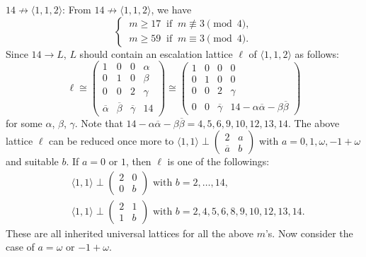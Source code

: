 \documentclass[a4paper,10pt,reqno]{amsart}
\begin{document}
{} $14 \not\to {\langle {1,1,2} \rangle}$: From $14 \not\to {\langle {1,1,2} \rangle}$, we have
\[
    \begin{cases}
        ~m \ge 17 ~\text{ if } ~m {\not\equiv} 3 \pmod{4},\\
        ~m \ge 59 ~\text{ if } ~m \equiv  3 \pmod{4}.
    \end{cases}
\]
Since $14 \to L$, $L$ should contain an escalation lattice $\ell$ of ${\langle {1,1,2} \rangle}$ as follows:
\[  \ell \cong
    \begin{pmatrix}
        1 & 0 & 0 & \alpha \\
        0 & 1 & 0 & \beta \\
        0 & 0 & 2 & \gamma \\
        {\overline{{\alpha}}} & {\overline{{\beta}}} & {\overline{{\gamma}}} & 14
    \end{pmatrix}
    \cong
    \begin{pmatrix}
        1 & 0 & 0 & 0 \\
        0 & 1 & 0 & 0 \\
        0 & 0 & 2 & \gamma \\
        0 & 0 & {\overline{{\gamma}}} & 14-\alpha{\overline{{\alpha}}}-\beta{\overline{{\beta}}}
    \end{pmatrix}
\]
for some $\alpha$, $\beta$, $\gamma$. Note that $14 -\alpha {\overline{{\alpha}}} - \beta {\overline{{\beta}}} = 4,
5, 6, 9, 10, 12, 13, 14$. The above lattice $\ell$ can be reduced once more to ${\langle {1,1} \rangle} \perp
{\begin{pmatrix}
  2 & a \\
  {{\overline{{a}}}} & b
\end{pmatrix}}$ with $a = 0, 1, \omega, -1+\omega$ and suitable $b$. If $a=0$ or $1$,
then $\ell$ is one of the followings:
\begin{align*}
    &{\langle {1,1} \rangle}\perp{\begin{pmatrix}
  2 & 0 \\
  0 & b
\end{pmatrix}} \text{ with } b=2,\dotsc,14, \\
    &{\langle {1,1} \rangle}\perp{\begin{pmatrix}
  2 & 1 \\
  1 & b
\end{pmatrix}} \text{ with } b=2,4,5,6,8,9,10,12,13,14.
\end{align*}
These are all inherited universal lattices for all the above $m$'s. Now consider the case of
$a=\omega$ or $-1+\omega$.
\end{document}
